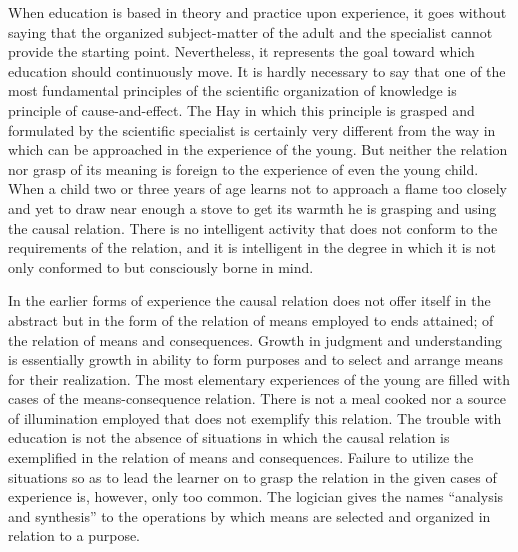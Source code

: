 When education is based in theory and practice upon experience, it goes without 
saying that the organized subject-matter of the adult and the specialist cannot provide the 
starting point. Nevertheless, it represents the goal toward which education should 
continuously move. It is hardly necessary to say that one of the most fundamental 
principles of the scientific organization of knowledge is principle of cause-and-effect. 
The Hay in which this principle is grasped and formulated by the scientific specialist is 
certainly very different from the way in which can be approached in the experience of the 
young. But neither the relation nor grasp of its meaning is foreign to the experience of 
even the young child. When a child two or three years of age learns not to approach a 
flame too closely and yet to draw near enough a stove to get its warmth he is grasping 
and using the causal relation. There is no intelligent activity that does not conform to the requirements of the relation, and it is intelligent in the degree in which it is not only 
conformed to but consciously borne in mind. 

In the earlier forms of experience the causal relation does not offer itself in the 
abstract but in the form of the relation of means employed to ends attained; of the relation 
of means and consequences. Growth in judgment and understanding is essentially growth 
in ability to form purposes and to select and arrange means for their realization. The most 
elementary experiences of the young are filled with cases of the means-consequence 
relation. There is not a meal cooked nor a source of illumination employed that does not 
exemplify this relation. The trouble with education is not the absence of situations in 
which the causal relation is exemplified in the relation of means and consequences. 
Failure to utilize the situations so as to lead the learner on to grasp the relation in the 
given cases of experience is, however, only too common. The logician gives the names 
\enquote{analysis and synthesis} to the operations by which means are selected and organized in 
relation to a purpose. 

